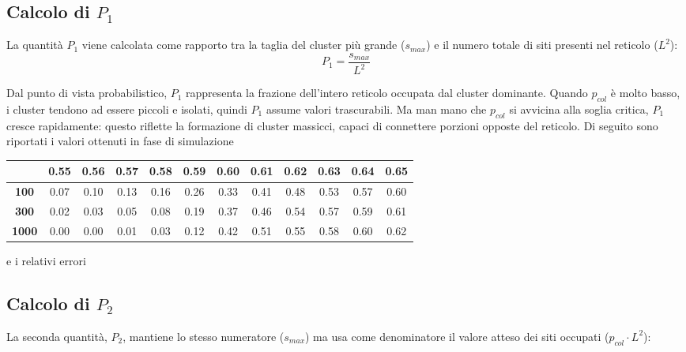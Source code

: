 \subsection{Calcolo di $P_{1}$}

La quantità $P_1$ viene calcolata come rapporto tra la taglia del cluster più grande ($s_{max}$) e il numero totale di siti presenti nel reticolo ($L^2$):
\vspace{4px}
\begin{equation}
	P_1 = \frac{s_{max}}{L^2}
\end{equation}

\vspace{4px}
\noindent
Dal punto di vista probabilistico, $P_1$ rappresenta la frazione dell'intero reticolo occupata dal cluster dominante. Quando $p_{col}$ è molto basso, i cluster tendono ad essere piccoli e isolati, quindi $P_1$ assume valori trascurabili. Ma man mano che $p_{col}$ si avvicina alla soglia critica, $P_1$ cresce rapidamente: questo riflette la formazione di cluster massicci, capaci di connettere porzioni opposte del reticolo. Di seguito sono riportati i valori ottenuti in fase di simulazione

\vspace{15px}
\noindent
\begin{tabular}{|c|*{11}{c|}}
	\hline
	\textbf{} & \textbf{0.55} & \textbf{0.56} & \textbf{0.57} & \textbf{0.58} & \textbf{0.59} & \textbf{0.60} & \textbf{0.61} & \textbf{0.62} & \textbf{0.63} & \textbf{0.64} & \textbf{0.65} \\
	\hline
	\textbf{100}  & 0.07 & 0.10 & 0.13 & 0.16 & 0.26 & 0.33 & 0.41 & 0.48 & 0.53 & 0.57 & 0.60 \\
	\hline
	\textbf{300}  & 0.02 & 0.03 & 0.05 & 0.08 & 0.19 & 0.37 & 0.46 & 0.54 & 0.57 & 0.59 & 0.61 \\
	\hline
	\textbf{1000} & 0.00 & 0.00 & 0.01 & 0.03 & 0.12 & 0.42 & 0.51 & 0.55 & 0.58 & 0.60 & 0.62 \\
	\hline
\end{tabular}

\vspace{15px}
\noindent
e i relativi errori

\subsection{Calcolo di $P_{2}$}

La seconda quantità, $P_2$, mantiene lo stesso numeratore ($s_{max}$) ma usa come denominatore il valore atteso dei siti occupati ($p_{col} \cdot L^2$):

